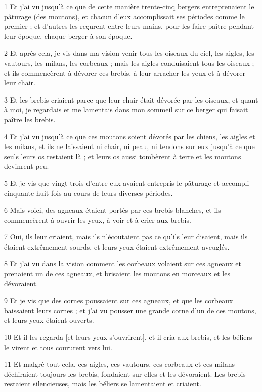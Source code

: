 
\par 1 Et j'ai vu jusqu'à ce que de cette manière trente-cinq bergers entreprenaient le pâturage (des moutons), et chacun d'eux accomplissait ses périodes comme le premier ; et d'autres les reçurent entre leurs mains, pour les faire paître pendant leur époque, chaque berger à son époque.
\par 2 Et après cela, je vis dans ma vision venir tous les oiseaux du ciel, les aigles, les vautours, les milans, les corbeaux ; mais les aigles conduisaient tous les oiseaux ; et ils commencèrent à dévorer ces brebis, à leur arracher les yeux et à dévorer leur chair.
\par 3 Et les brebis criaient parce que leur chair était dévorée par les oiseaux, et quant à moi, je regardais et me lamentais dans mon sommeil sur ce berger qui faisait paître les brebis.
\par 4 Et j'ai vu jusqu'à ce que ces moutons soient dévorés par les chiens, les aigles et les milans, et ils ne laissaient ni chair, ni peau, ni tendons sur eux jusqu'à ce que seuls leurs os restaient là ; et leurs os aussi tombèrent à terre et les moutons devinrent peu.
\par 5 Et je vis que vingt-trois d'entre eux avaient entrepris le pâturage et accompli cinquante-huit fois au cours de leurs diverses périodes.
\par 6 Mais voici, des agneaux étaient portés par ces brebis blanches, et ils commencèrent à ouvrir les yeux, à voir et à crier aux brebis.
\par 7 Oui, ils leur criaient, mais ils n'écoutaient pas ce qu'ils leur disaient, mais ils étaient extrêmement sourds, et leurs yeux étaient extrêmement aveuglés.
\par 8 Et j'ai vu dans la vision comment les corbeaux volaient sur ces agneaux et prenaient un de ces agneaux, et brisaient les moutons en morceaux et les dévoraient.
\par 9 Et je vis que des cornes poussaient sur ces agneaux, et que les corbeaux baissaient leurs cornes ; et j'ai vu pousser une grande corne d'un de ces moutons, et leurs yeux étaient ouverts.
\par 10 Et il les regarda [et leurs yeux s'ouvrirent], et il cria aux brebis, et les béliers le virent et tous coururent vers lui.
\par 11 Et malgré tout cela, ces aigles, ces vautours, ces corbeaux et ces milans déchiraient toujours les brebis, fondaient sur elles et les dévoraient. Les brebis restaient silencieuses, mais les béliers se lamentaient et criaient.

